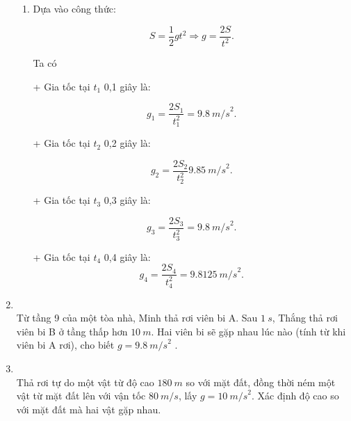 \begin{enumerate}[label=\bfseries Bài \arabic*:,leftmargin=1.5cm]
{\begin{enumerate}[label=\alph*)]
			Như vậy, sau cùng 1 khoảng là 0,1 giây như nhau nhưng vật rơi được những khoảng khác nhau, càng về sau thì rơi càng nhanh hơn. 
			
			\item Dựa vào công thức:
			
			$$S = \dfrac{1}{2}gt^2 \Rightarrow g = \dfrac{2S}{t^2}.$$
			
			Ta có
			
			+ Gia tốc tại $t_1$  0,1 giây là: 
			
			$$g_1 = \dfrac{2 S_1}{t_1^2}= \SI{9,8}{m/s}^2.$$
			
			+ Gia tốc tại $t_2$ 0,2 giây là: 
			
			$$g_2 = \dfrac{2 S_2}{t_2^2}\SI{9,85}{m/s}^2.$$
			
			+ Gia tốc tại $t_3$ 0,3 giây là: 
			
			$$g_3 = \dfrac{2 S_3}{t_3^2}=\SI{9,8}{m/s}^2.$$
			
			+ Gia tốc tại $t_4$ 0,4 giây là: 
			$$g_4 = \dfrac{2S_4}{t_4^2}=\SI{9,8125}{m/s}^2.$$
			
			
		\end{enumerate}
	}

	\item {}\\
	{		Từ tầng 9 của một tòa nhà, Minh thả rơi viên bi A. Sau $\SI{1}{s}$, Thắng thả rơi viên bi B ở tầng thấp hơn $\SI{10}{m}$. Hai viên bi sẽ gặp nhau lúc nào (tính từ khi viên bi A rơi), cho biết $g =\SI{9,8}{m/s}^2$ .
	}

\item {}\\
{Thả rơi tự do một vật từ độ cao $\SI{180}{m}$ so với mặt đất, đồng thời ném một vật từ mặt đất lên với vận tốc $\SI{80}{m/s}$, lấy $g = \SI{10}{m/s}^2$. Xác định độ cao so với mặt đất mà hai vật gặp nhau.
}
\end{enumerate}
